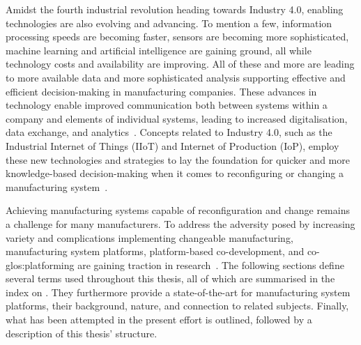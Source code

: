 Amidst the fourth industrial revolution heading towards Industry 4.0, enabling technologies are also evolving and advancing.
To mention a few, information processing speeds are becoming faster, sensors are becoming more sophisticated, machine learning and artificial intelligence are gaining ground, all while technology costs and availability are improving.
All of these and more are leading to more available data and more sophisticated analysis supporting effective and efficient decision-making in manufacturing companies.
These advances in technology enable improved communication both between systems within a company and elements of individual systems, leading to increased digitalisation, data exchange, and analytics~\parencite{Jeschke2017}.
Concepts related to Industry 4.0, such as the Industrial Internet of Things (IIoT) and Internet of Production (IoP), employ these new technologies and strategies to lay the foundation for quicker and more knowledge-based decision-making when it comes to reconfiguring or changing a manufacturing system~\parencite{ElMaraghySmartChange}.

Achieving manufacturing systems capable of reconfiguration and change remains a challenge for many manufacturers.
To address the adversity posed by increasing variety and complications implementing changeable manufacturing, manufacturing system platforms, platform-based co-development, and co-\gls{glos:platforming} are gaining traction in research~\parencite{MichaelisJohannesson,ElMaraghy2015407,ABBAS201851,SorensenMCPC2017}.
The following sections define several terms used throughout this thesis, all of which are summarised in the index on . 
They furthermore provide a state-of-the-art for manufacturing system platforms, their background, nature, and connection to related subjects.
Finally, what has been attempted in the present effort is outlined, followed by a description of this thesis' structure.





